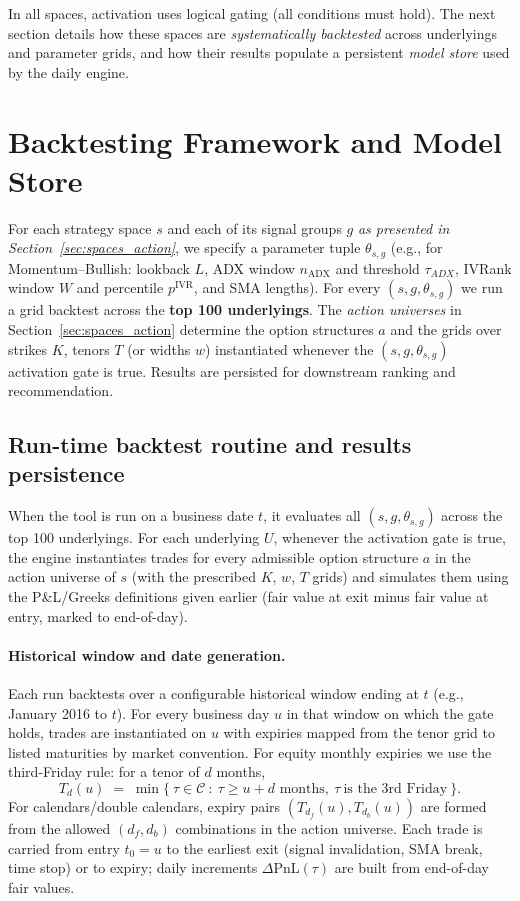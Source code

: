 \documentclass[12pt,a4paper]{report}
\begin{document}
\medskip
In all spaces, activation uses logical gating (all conditions must hold). The next section details how these spaces are \emph{systematically backtested} across underlyings and parameter grids, and how their results populate a persistent \emph{model store} used by the daily engine.

\section{Backtesting Framework and Model Store}
\label{sec:bt_modelstore}

For each strategy space $s$ and each of its signal groups $g$ \emph{as presented in Section~\ref{sec:spaces_action}}, we specify a parameter tuple $\theta_{s,g}$ (e.g., for Momentum–Bullish: lookback $L$, ADX window $n_{\mathrm{ADX}}$ and threshold $\tau_{\!ADX}$, IVRank window $W$ and percentile $p^{\text{IVR}}$, and SMA lengths). For every $(s,g,\theta_{s,g})$ we run a grid backtest across the \textbf{top 100 underlyings}. The \emph{action universes} in Section~\ref{sec:spaces_action} determine the option structures $a$ and the grids over strikes $K$, tenors $T$ (or widths $w$) instantiated whenever the $(s,g,\theta_{s,g})$ activation gate is true. Results are persisted for downstream ranking and recommendation.

\subsection{Run-time backtest routine and results persistence}

When the tool is run on a business date $t$, it evaluates all $(s,g,\theta_{s,g})$ across the top 100 underlyings. For each underlying $U$, whenever the activation gate is true, the engine instantiates trades for every admissible option structure $a$ in the action universe of $s$ (with the prescribed $K$, $w$, $T$ grids) and simulates them using the P\&L/Greeks definitions given earlier (fair value at exit minus fair value at entry, marked to end-of-day).

\paragraph{Historical window and date generation.}
Each run backtests over a configurable historical window ending at $t$ (e.g., January 2016 to $t$). For every business day $u$ in that window on which the gate holds, trades are instantiated on $u$ with expiries mapped from the tenor grid to listed maturities by market convention. For equity monthly expiries we use the third-Friday rule: for a tenor of $d$ months,
\[
T_d(u)\;=\;\min\{\ \tau\in\mathcal{C}\ :\ \tau\ge u+d\text{ months},\ \tau\ \text{is the 3rd Friday}\ \}.
\]
For calendars/double calendars, expiry pairs $(T_{d_f}(u),T_{d_b}(u))$ are formed from the allowed $(d_f,d_b)$ combinations in the action universe. Each trade is carried from entry $t_0=u$ to the earliest exit (signal invalidation, SMA break, time stop) or to expiry; daily increments $\Delta\mathrm{PnL}(\tau)$ are built from end-of-day fair values.
\end{document}

